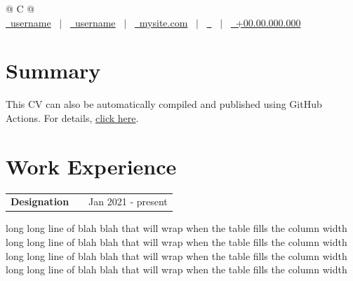 \documentclass[a4paper,12pt]{article}
\makeatletter
\newenvironment{jobshort}[2]
    {
    \begin{tabularx}{\linewidth}{@{}l X r@{}}
    \textbf{#1} & \hfill &  #2 \\[3.75pt]
    \end{tabularx}
    }
    {
    }
\makeatother
\begin{document}
\pagestyle{empty} 



\begin{tabularx}{\linewidth}{@{} C @{}}
\Huge{\cvname} \\[7.5pt]
\href{https://github.com/username}{\raisebox{-0.05\height}\faGithub\ username} \ $|$ \ 
\href{https://linkedin.com/in/username}{\raisebox{-0.05\height}\faLinkedin\ username} \ $|$ \ 
\href{https://mysite.com}{\raisebox{-0.05\height}\faGlobe \ mysite.com} \ $|$ \ 
\href{mailto:\cvemail}{\raisebox{-0.05\height}\faEnvelope \ \cvemail} \ $|$ \ 
\href{tel:+000000000000}{\raisebox{-0.05\height}\faMobile \ +00.00.000.000} \\
\end{tabularx}


\section{Summary}
This CV can also be automatically compiled and published using GitHub Actions. For details, \href{https://github.com/jitinnair1/autoCV}{click here}.

\section{Work Experience}

\begin{jobshort}{Designation}{Jan 2021 - present}
long long line of blah blah that will wrap when the table fills the column width long long line of blah blah that will wrap when the table fills the column width long long line of blah blah that will wrap when the table fills the column width long long line of blah blah that will wrap when the table fills the column width
\end{jobshort}
\end{document}
